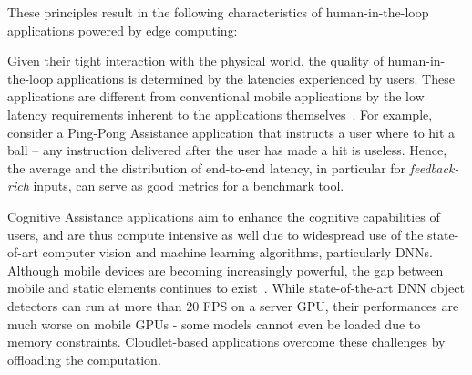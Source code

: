 
These principles result in the following characteristics of human-in-the-loop applications powered by edge computing:

\begin{description}[labelindent=\parindent, listparindent=\parindent, style=unboxed, leftmargin=0cm]
	\item[Latency Sensitive:] Given their tight interaction with the physical world, the quality of human-in-the-loop applications is determined by the latencies experienced by users. 
    These applications are different from conventional mobile applications by the low latency requirements inherent to the applications themselves~\cite{Suzuki2016Vehicle,Chen2017Empirical}. 
    For example, consider a Ping-Pong Assistance application that instructs a user where to hit a ball -- any instruction delivered after the user has made a hit is useless.
  Hence, the average and the distribution of end-to-end latency, in particular for \emph{feedback-rich} inputs, can serve as good metrics for a benchmark tool. 
	
    \item[Compute Intensive:] Cognitive Assistance applications aim to enhance the cognitive capabilities of users, and are thus compute intensive as well due to widespread use of the state-of-art computer vision and machine learning algorithms, particularly \acp{DNN}. 
    Although mobile devices are becoming increasingly powerful, the gap between mobile and static elements continues to exist~\cite{Flinn2012Cyber}. 
    While state-of-the-art DNN object detectors can run at more than 20 \acs{FPS} on a server \acs{GPU}, their performances are much worse on mobile \acsp{GPU} - some models cannot even be loaded due to memory constraints. 
    Cloudlet-based applications overcome these challenges by offloading the computation. 

\end{description}


